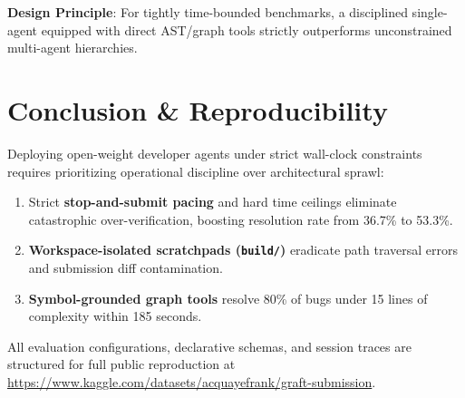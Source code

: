 \documentclass[10pt,twocolumn,letterpaper]{article}
\begin{document}
\noindent\textbf{Design Principle}: For tightly time-bounded benchmarks, a disciplined single-agent equipped with direct AST/graph tools strictly outperforms unconstrained multi-agent hierarchies.

\section{Conclusion \& Reproducibility}

Deploying open-weight developer agents under strict wall-clock constraints requires prioritizing operational discipline over architectural sprawl:
\begin{enumerate}
    \item Strict \textbf{stop-and-submit pacing} and hard time ceilings eliminate catastrophic over-verification, boosting resolution rate from 36.7\% to 53.3\%.
    \item \textbf{Workspace-isolated scratchpads (\texttt{build/})} eradicate path traversal errors and submission diff contamination.
    \item \textbf{Symbol-grounded graph tools} resolve 80\% of bugs under 15 lines of complexity within 185 seconds.
\end{enumerate}

All evaluation configurations, declarative schemas, and session traces are structured for full public reproduction at \url{https://www.kaggle.com/datasets/acquayefrank/graft-submission}.
\end{document}
